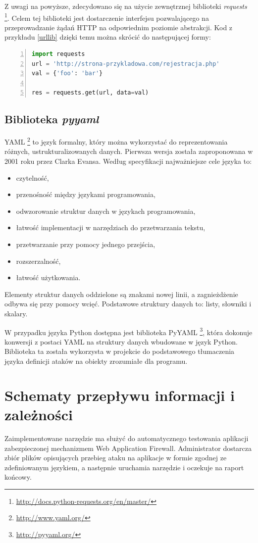 \documentclass[11pt,a4paper,polish,thesis]{dcsbook}
\begin{document}
Z uwagi na powyższe, zdecydowano się na użycie zewnętrznej biblioteki \textit{requests} \footnote{\url{http://docs.python-requests.org/en/master/}}. Celem tej biblioteki jest dostarczenie interfejsu pozwalającego na przeprowadzanie żądań HTTP na odpowiednim poziomie abstrakcji. Kod z przykładu \ref{urllib} dzięki temu można skrócić do następującej formy:
\begin{lstlisting}[language=python,frame=single,label=req1,numbers=left]
import requests
url = 'http://strona-przykladowa.com/rejestracja.php'
val = {'foo': 'bar'}

res = requests.get(url, data=val)
\end{lstlisting}

\subsection{Biblioteka \textit{pyyaml}}
YAML \footnote{\url{http://www.yaml.org/}} to język formalny, który można wykorzystać do reprezentowania różnych, ustrukturalizowanych danych. Pierwsza wersja została zaproponowana w 2001 roku przez Clarka Evansa. Według specyfikacji \cite{yamlspec} najważniejsze cele języka to: 
\begin{itemize}
\item czytelność,
\item przenośność między językami programowania,
\item odwzorowanie struktur danych w językach programowania,
\item łatwość implementacji w narzędziach do przetwarzania tekstu,
\item przetwarzanie przy pomocy jednego przejścia,
\item rozszerzalność,
\item łatwość użytkowania.
\end{itemize}

Elementy struktur danych oddzielone są znakami nowej linii, a zagnieżdżenie odbywa się przy pomocy wcięć. Podstawowe struktury danych to: listy, słowniki i skalary.

W przypadku języka Python dostępna jest biblioteka PyYAML \footnote{\url{http://pyyaml.org/}}, która dokonuje konwersji z postaci YAML na struktury danych wbudowane w język Python. Biblioteka ta została wykorzysta w projekcie do podstawowego tłumaczenia języka definicji ataków na obiekty zrozumiałe dla programu.

\section{Schematy przepływu informacji i zależności}
Zaimplementowane narzędzie ma służyć do automatycznego testowania aplikacji zabezpieczonej mechanizmem Web Application Firewall. Administrator dostarcza zbiór plików opisujących przebieg ataku na aplikacje w formie zgodnej ze zdefiniowanym językiem, a następnie uruchamia narzędzie i oczekuje na raport końcowy.
\end{document}
